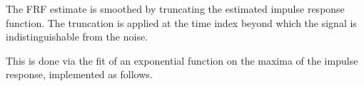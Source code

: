 The FRF estimate is smoothed by truncating the estimated impulse response function. The truncation is applied at the time index beyond which the signal is indistinguishable from the noise. %



This is done via the fit of an exponential function on the maxima of the impulse response, implemented as follows.

%
%
%

